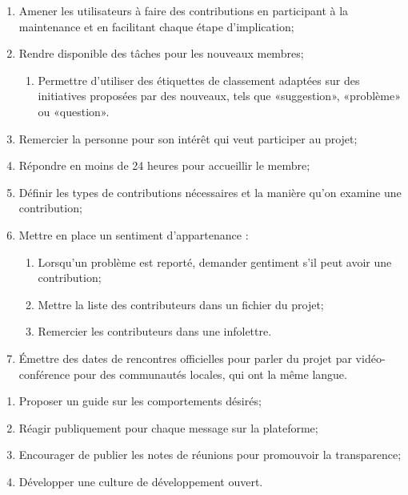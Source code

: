 \begin{enumerate}
    \item Amener les utilisateurs à faire des contributions en participant à la maintenance et en facilitant chaque étape d'implication;
    \item Rendre disponible des tâches pour les nouveaux membres;
    \begin{enumerate}
        \item Permettre d'utiliser des étiquettes de classement adaptées sur des initiatives proposées par des nouveaux, tels que «suggestion», «problème» ou «question».
    \end{enumerate}
    \item Remercier la personne pour son intérêt qui veut participer au projet;
    \item Répondre en moins de 24 heures pour accueillir le membre;
    \item Définir les types de contributions nécessaires et la manière qu'on examine une contribution;
    \item Mettre en place un sentiment d'appartenance :
    \begin{enumerate}
        \item Lorsqu'un problème est reporté, demander gentiment s'il peut avoir une contribution;
        \item Mettre la liste des contributeurs dans un fichier du projet;
        \item Remercier les contributeurs dans une infolettre.
    \end{enumerate}
    \item Émettre des dates de rencontres officielles pour parler du projet par vidéo-conférence pour des communautés locales, qui ont la même langue.
\end{enumerate}

 \label{annexe_guide_comportement}

\begin{enumerate}
    \item Proposer un guide sur les comportements désirés;
    \item Réagir publiquement pour chaque message sur la plateforme;
    \item Encourager de publier les notes de réunions pour promouvoir la transparence;
    \item Développer une culture de développement ouvert.
\end{enumerate}


